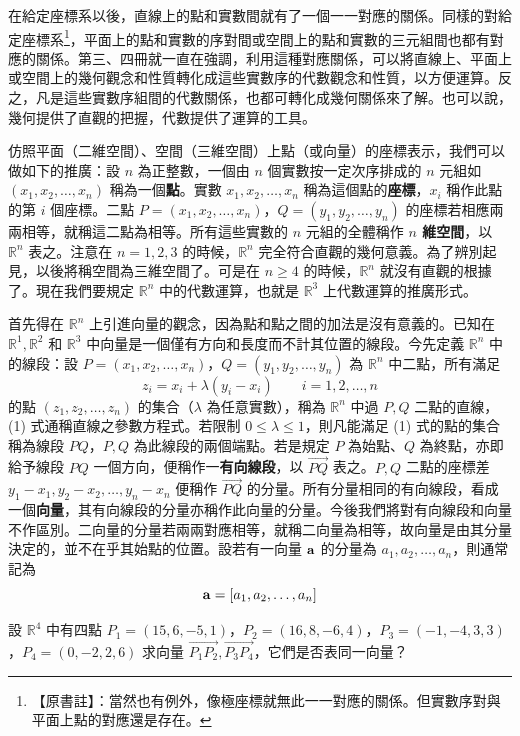 在給定座標系以後，直線上的點和實數間就有了一個一一對應的關係。同樣的對給定座標系\footnote{【原書註】：當然也有例外，像極座標就無此一一對應的關係。但實數序對與平面上點的對應還是存在。}，平面上的點和實數的序對間或空間上的點和實數的三元組間也都有對應的關係。第三、四冊就一直在強調，利用這種對應關係，可以將直線上、平面上或空間上的幾何觀念和性質轉化成這些實數序的代數觀念和性質，以方便運算。反之，凡是這些實數序組間的代數關係，也都可轉化成幾何關係來了解。也可以說，幾何提供了直觀的把握，代數提供了運算的工具。

仿照平面（二維空間）、空間（三維空間）上點（或向量）的座標表示，我們可以做如下的推廣：設 $n$ 為正整數，一個由 $n$ 個實數按一定次序排成的 $n$ 元組如 $(x_1, x_2, \dots, x_n)$ 稱為一個\textbf{點}。實數 $x_1, x_2, \dots, x_n$ 稱為這個點的\textbf{座標}，$x_i$ 稱作此點的第 $i$ 個座標。二點 $P=(x_1, x_2, \dots, x_n)$，$Q=(y_1, y_2, \dots, y_n)$ 的座標若相應兩兩相等，就稱這二點為相等。所有這些實數的 $n$ 元組的全體稱作 \textbf{$n$ 維空間}，以 $\mathbb{R}^n$ 表之。注意在 $n=1, 2, 3$ 的時候，$\mathbb{R}^n$ 完全符合直觀的幾何意義。為了辨別起見，以後將稱空間為三維空間了。可是在 $n \ge 4$ 的時候，$\mathbb{R}^n$ 就沒有直觀的根據了。現在我們要規定 $\mathbb{R}^n$ 中的代數運算，也就是 $\mathbb{R}^3$ 上代數運算的推廣形式。

首先得在 $\mathbb{R}^n$ 上引進向量的觀念，因為點和點之間的加法是沒有意義的。已知在 $\mathbb{R}^1, \mathbb{R}^2$ 和 $\mathbb{R}^3$ 中向量是一個僅有方向和長度而不計其位置的線段。今先定義 $\mathbb{R}^n$ 中的線段：設 $P=(x_1, x_2, \dots, x_n)$，$Q=(y_1, y_2, \dots, y_n)$ 為 $\mathbb{R}^n$ 中二點，所有滿足
\begin{equation}
z_i = x_i + \lambda (y_i - x_i) \qquad i=1, 2, \dots, n \label{eq:b6-1-1-1}
\end{equation}
的點 $(z_1, z_2, \dots, z_n)$ 的集合（$\lambda$ 為任意實數），稱為 $\mathbb{R}^n$ 中過 $P, Q$ 二點的直線，(1) 式通稱直線之參數方程式。若限制 $0 \le \lambda \le 1$，則凡能滿足 (1) 式的點的集合稱為線段 $PQ$，$P, Q$ 為此線段的兩個端點。若是規定 $P$ 為始點、$Q$ 為終點，亦即給予線段 $PQ$ 一個方向，便稱作一\textbf{有向線段}，以 $\vec{PQ}$ 表之。$P, Q$ 二點的座標差 $y_1 - x_1, y_2 - x_2, \dots, y_n - x_n$ 便稱作 $\vec{PQ}$ 的分量。所有分量相同的有向線段，看成一個\textbf{向量}，其有向線段的分量亦稱作此向量的分量。今後我們將對有向線段和向量不作區別。二向量的分量若兩兩對應相等，就稱二向量為相等，故向量是由其分量決定的，並不在乎其始點的位置。設若有一向量 $\boldsymbol{\mathbf{a}}$ 的分量為 $a_1, a_2, \dots, a_n$，則通常記為
\[ \boldsymbol{\mathbf{a}} = [a_1, a_2, \dots, a_n] \]

\begin{example}\label{ex:b6-1-1}
設 $\mathbb{R}^4$ 中有四點 $P_1=(15, 6, -5, 1)$，$P_2=(16, 8, -6, 4)$，$P_3=(-1, -4, 3, 3)$，$P_4=(0, -2, 2, 6)$ 求向量 $\vec{P_1P_2}, \vec{P_3P_4}$，它們是否表同一向量？
\end{example}

